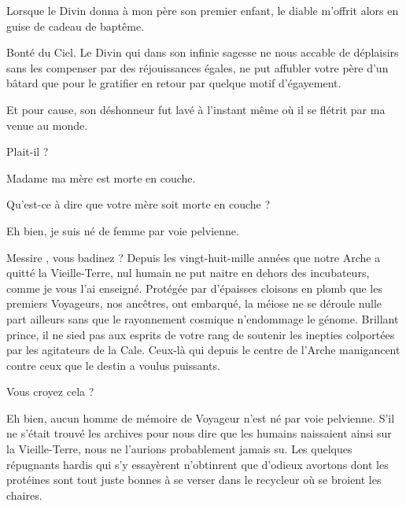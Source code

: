 \begin{drama}
  \elenaspeaks Lorsque le Divin donna à mon père son premier enfant, le diable m’offrit alors en guise de cadeau de baptême. %

  \alexasspeaks Bonté du Ciel. Le Divin qui dans son infinie sagesse ne nous accable de déplaisirs sans les compenser par des réjouissances égales,  ne put affubler votre père d’un bâtard que pour le gratifier en retour par quelque motif d’égayement.

  \elenaspeaks Et pour cause, son déshonneur fut lavé à l’instant même où il se flétrit par ma venue au monde.

  \alexasspeaks Plait-il ?

  \elenaspeaks Madame ma mère est morte en couche.

  \alexasspeaks Qu’est-ce à dire que votre mère soit morte en couche ?

  \elenaspeaks Eh bien, je suis né de femme par voie pelvienne. 

  \alexasspeaks Messire \elena, vous badinez  ? %
                Depuis les vingt-huit-mille années que notre Arche a quitté la Vieille-Terre, nul humain ne put naitre en dehors des incubateurs, comme je vous l’ai enseigné. Protégée par d’épaisses cloisons en plomb que les premiers Voyageurs, nos ancêtres, ont embarqué, la méiose ne se déroule nulle part ailleurs sans que le rayonnement cosmique n’endommage le génome. Brillant prince, il ne sied pas aux esprits de votre rang de soutenir les inepties colportées par les agitateurs de la Cale. Ceux-là qui depuis le centre de l’Arche manigancent contre ceux que le destin a voulus puissants.


  \elenaspeaks Vous croyez cela ?


  \alexasspeaks Eh %
   bien, aucun homme de mémoire de Voyageur n’est né par voie pelvienne. S’il ne s’était trouvé les archives pour nous dire que les humains naissaient ainsi sur la Vieille-Terre, nous ne l’aurions probablement jamais su. Les quelques répugnants hardis qui s’y essayèrent n’obtinrent que d’odieux avortons dont les protéines sont tout juste bonnes à se verser dans le recycleur où se broient les chaires.


\end{drama}

